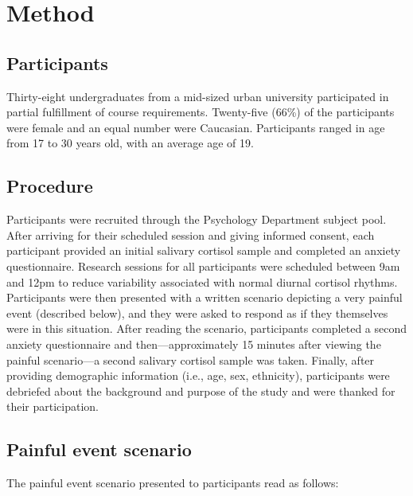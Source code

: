 \documentclass[review]{elsarticle}\usepackage[]{graphicx}\usepackage[]{color}
\begin{document}
\section*{Method}
\label{sec:method1}

\subsection*{Participants}
\label{sub:participants1}

Thirty-eight undergraduates from a mid-sized urban university participated in partial fulfillment of course requirements.
Twenty-five (66\%) of the participants were female and an equal number were Caucasian.
Participants ranged in age from 17 to 30 years old, with an average age of 19.

\subsection*{Procedure}
\label{sub:procedure1}

Participants were recruited through the Psychology Department subject pool.
After arriving for their scheduled session and giving informed consent, each participant provided an initial salivary cortisol sample and completed an anxiety questionnaire.
Research sessions for all participants were scheduled between 9am and 12pm to reduce variability associated with normal diurnal cortisol rhythms.
Participants were then presented with a written scenario depicting a very painful event (described below), and they were asked to respond as if they themselves were in this situation.
After reading the scenario, participants completed a second anxiety questionnaire and then---approximately 15 minutes after viewing the painful scenario---a second salivary cortisol sample was taken.
Finally, after providing demographic information (i.e., age, sex, ethnicity), participants were debriefed about the background and purpose of the study and were thanked for their participation.

\subsection*{Painful event scenario}
\label{sub:paineventscenario}

The painful event scenario presented to participants read as follows:
\end{document}
